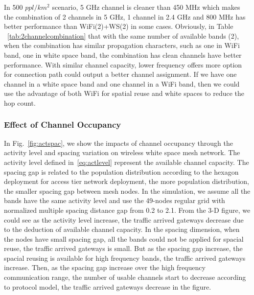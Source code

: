 In 500 $ppl/km^2$ scenario, 5 GHz channel is cleaner than 450 MHz which makes 
the combination of 2 channels in 5 GHz, 1 channel in 2.4 GHz and 800 MHz has 
better performance than WiFi(2)+WS(2) in some cases.  Obviously, in Table
~\ref{tab:2channelcombination} that with the same number of available bands (2), 
when the combination has similar propagation characters, such as one in WiFi band, 
one in white space band, the combination has clean channels have better performance. 
With similar channel capacity, lower frequency offers more option for connection 
path could output a better channel assignment. If we have one channel in a white 
space band and one channel in a WiFi band, then we could use the advantage of both 
WiFi for spatial reuse and white spaces to reduce the hop count. 



\subsubsection{Effect of Channel Occupancy}



In Fig.~\ref{fig:actspac}, we show the impacts of channel occupancy through 
the activity level and spacing variation on wireless white space mesh network. 
The activity level defined in~\ref{eq:actlevel} represent the available channel
capacity. The spacing gap is related to the population distribution according to 
the hexagon deployment for access tier network deployment, the more population
distribution, the smaller spacing gap between mesh nodes. In the simulation, we 
assume all the bands have the same activity level and use the 49-nodes regular 
grid with normalized multiple spacing distance gap from 0.2 to 2.1. From the 3-D 
figure, we could see as the activity level increase, the traffic arrived gateways 
decrease due to the deduction of available channel capacity. In the spacing dimension, 
when the nodes have small spacing gap, all the bands could not be applied for 
spacial reuse, the traffic arrived gateways is small. But as the spacing gap 
increase, the spacial reusing is available for high frequency bands, the traffic 
arrived gateways increase. Then, as the spacing gap increase over the high 
frequency communication range, the number of usable channels start to decrease 
according to protocol model, the traffic arrived gateways decrease in the figure.

